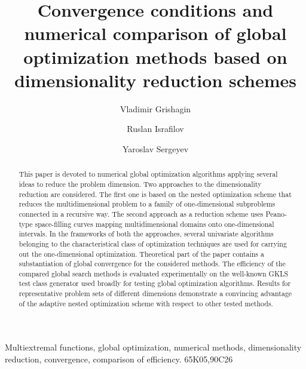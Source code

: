 \documentclass[preprint]{elsarticle}
\begin{document}
\begin{frontmatter}

\title{Convergence conditions and numerical comparison of global optimization methods based on dimensionality reduction schemes}

\author[russia_address]{Vladimir Grishagin}

\author[russia_address]{Ruslan Israfilov}

\author[russia_address,italy_address]{Yaroslav Sergeyev}

\address[russia_address]{Department of Software and Supercomputing, Lobachevsky State University, Gagarin Avenue 23, 603950 Nizhni Novgorod, Russia.}
\address[italy_address]{DIMES, Università della Calabria, Italy.}


\begin{abstract}
This paper is devoted to numerical global optimization algorithms applying several ideas to reduce the problem dimension. Two approaches to the dimensionality reduction are considered. The first one is based on the nested optimization scheme that reduces the multidimensional problem to a family of one-dimensional subproblems connected in a recursive way. The second approach as a reduction scheme uses Peano-type space-filling curves mapping multidimensional domains onto one-dimensional intervals. In the frameworks of both the approaches, several univariate algorithms belonging to the characteristical class of optimization techniques are used for carrying out the one-dimensional optimization. Theoretical part of the paper contains a substantiation of global convergence for the considered methods. The efficiency of the compared global search methods is evaluated experimentally on the well-known GKLS test class generator used broadly for testing global optimization algorithms. Results for representative problem sets of different dimensions demonstrate a convincing advantage of the adaptive nested optimization scheme with respect to other tested methods.
\end{abstract}

\begin{keyword}
Multiextremal functions, global optimization, numerical methods, dimensionality reduction, convergence, comparison of efficiency.
\MSC[2010] 65K05\sep 90C26
\end{keyword}

\end{frontmatter}
\end{document}
